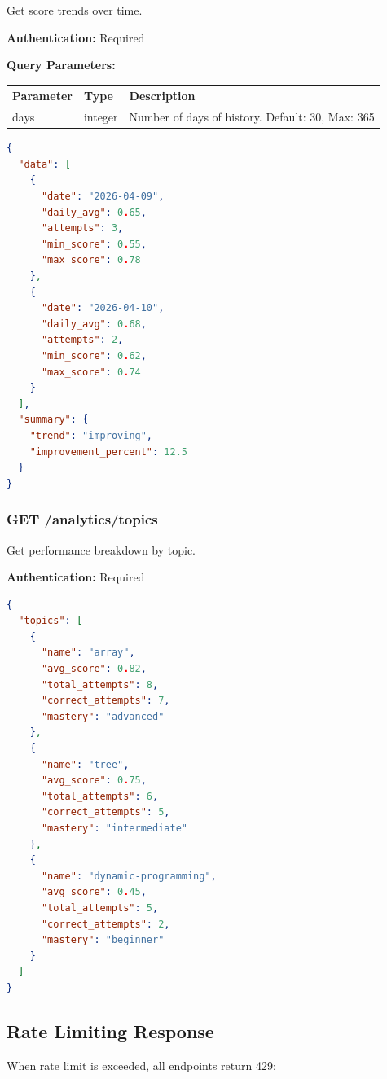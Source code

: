 \documentclass[12pt,a4paper,oneside]{article}
\begin{document}
Get score trends over time.

\textbf{Authentication:} Required

\textbf{Query Parameters:}

\begin{table}[H]
\centering
\begin{tabular}{|p{2cm}|p{2cm}|p{8cm}|}
\hline
\textbf{Parameter} & \textbf{Type} & \textbf{Description} \\
\hline
days & integer & Number of days of history. Default: 30, Max: 365 \\
\hline
\end{tabular}
\end{table}

\begin{lstlisting}[language=JSON, caption=Response 200]
{
  "data": [
    {
      "date": "2026-04-09",
      "daily_avg": 0.65,
      "attempts": 3,
      "min_score": 0.55,
      "max_score": 0.78
    },
    {
      "date": "2026-04-10",
      "daily_avg": 0.68,
      "attempts": 2,
      "min_score": 0.62,
      "max_score": 0.74
    }
  ],
  "summary": {
    "trend": "improving",
    "improvement_percent": 12.5
  }
}
\end{lstlisting}

\subsubsection{GET /analytics/topics}

Get performance breakdown by topic.

\textbf{Authentication:} Required

\begin{lstlisting}[language=JSON, caption=Response 200]
{
  "topics": [
    {
      "name": "array",
      "avg_score": 0.82,
      "total_attempts": 8,
      "correct_attempts": 7,
      "mastery": "advanced"
    },
    {
      "name": "tree",
      "avg_score": 0.75,
      "total_attempts": 6,
      "correct_attempts": 5,
      "mastery": "intermediate"
    },
    {
      "name": "dynamic-programming",
      "avg_score": 0.45,
      "total_attempts": 5,
      "correct_attempts": 2,
      "mastery": "beginner"
    }
  ]
}
\end{lstlisting}

\subsection{Rate Limiting Response}

When rate limit is exceeded, all endpoints return 429:
\end{document}
